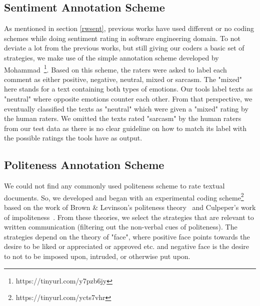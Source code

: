 \subsection{Sentiment Annotation Scheme}\label{sentscheme}


As mentioned in section \ref{rwsent}, previous works have used different or no coding schemes while doing sentiment rating in software engineering domain. To not deviate a lot from the previous works, but still giving our coders a basic set of strategies, we make use of the simple annotation scheme developed by Mohammad~\cite{mohammad2016practical}\footnote{https://tinyurl.com/y7pzb6jy}. Based on this scheme, the raters were asked to label each comment as either positive, negative, neutral, mixed or sarcasm. The "mixed" here stands for a text containing both types of emotions. Our tools label texts as "neutral" where opposite emotions counter each other. From that perspective, we eventually classified the texts as "neutral" which were given a "mixed" rating by the human raters. We omitted the texts rated "sarcasm" by the human raters from our test data as there is no clear guideline on how to match its label with the possible ratings the tools have as output. 

\subsection{Politeness Annotation Scheme}\label{polscheme}

We could not find any commonly used politeness scheme to rate textual documents. So, we developed and began with an experimental coding scheme\footnote{https://tinyurl.com/ycts7vhr} based on the work of Brown \& Levinson's politeness theory~\cite{brown1987politeness} and Culpeper's work of impoliteness~\cite{culpeper1996towards}. From these theories, we select the strategies that are relevant to written communication (filtering out the non-verbal cues of politeness). The strategies depend on the theory of "face", where positive face points towards the desire to be liked or appreciated or approved etc. and negative face is the desire to not to be imposed upon, intruded, or otherwise put upon.

